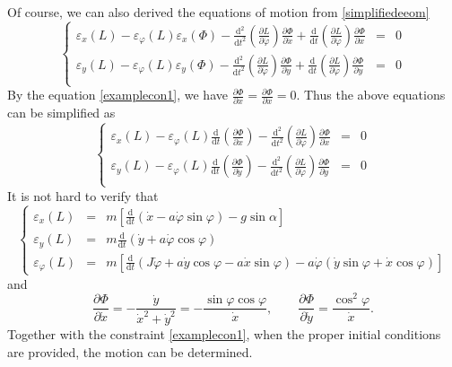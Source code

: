 \documentclass[preprint,11pt]{elsarticle}
\newcommand{\mathd}{\mathrm{d}}
\begin{document}
Of course, we can also derived the equations of motion from \eqref{simplifiedeeom}
\begin{equation}
\left\{\begin{array}{rcl}
    \varepsilon_x (L)-\varepsilon_{\varphi}(L) \varepsilon_{x}(\Phi)-\frac{\mathd^2 }{\mathd t^2}\left(\frac{\partial L}{\partial \dot{\varphi}} \right) \frac{\partial \Phi}{\partial \dot{x}}+\frac{\mathd}{\mathd t}\left( \frac{\partial L}{\partial \dot{\varphi}}\right)\frac{\partial \Phi}{\partial x} & = &0\\[12pt]
      \varepsilon_y (L)-\varepsilon_{\varphi}(L) \varepsilon_{y}(\Phi)-\frac{\mathd^2 }{\mathd t^2}\left(\frac{\partial L}{\partial \dot{\varphi}} \right) \frac{\partial \Phi}{\partial \dot{y}}+\frac{\mathd}{\mathd t}\left( \frac{\partial L}{\partial \dot{\varphi}}\right)\frac{\partial \Phi}{\partial y} & = &0\\
  \end{array}\right.
\end{equation}
By the equation \eqref{examplecon1}, we have $\frac{\partial \Phi}{\partial x}=\frac{\partial \Phi}{\partial x}=0$. Thus the above equations can be simplified as
\begin{equation}\label{simplifiedexampleeuler}
\left\{\begin{array}{rcl}
    \varepsilon_x (L)-\varepsilon_{\varphi}(L) \frac{\mathd}{\mathd t}\left( \frac{\partial \Phi}{\partial \dot{x}}\right) -\frac{\mathd^2 }{\mathd t^2}\left(\frac{\partial L}{\partial \dot{\varphi}} \right) \frac{\partial \Phi}{\partial \dot{x}}& = &0\\[12pt]
    \varepsilon_y (L)-\varepsilon_{\varphi}(L) \frac{\mathd}{\mathd t}\left( \frac{\partial \Phi}{\partial \dot{y}}\right) -\frac{\mathd^2 }{\mathd t^2}\left(\frac{\partial L}{\partial \dot{\varphi}} \right) \frac{\partial \Phi}{\partial \dot{y}}& = &0\\
  \end{array}\right.
\end{equation}
It is not hard to verify that
\begin{equation}
 \left\{\begin{array}{rcl}
 \varepsilon_x (L)&=&m \left[ \frac{\mathd}{\mathd t}\left( \dot{x}-a \dot{\varphi} \sin\varphi\right)- g \sin\alpha\right]\\[6pt]
 \varepsilon_y (L)&=&m  \frac{\mathd}{\mathd t}\left( \dot{y}+a \dot{\varphi} \cos\varphi\right)\\[6pt]
 \varepsilon_\varphi (L)&=&m \left[ \frac{\mathd}{\mathd t}\left( J \dot{\varphi}+a \dot{y}\cos \varphi-a \dot{x} \sin\varphi\right)-a \dot{\varphi}\left(\dot{y} \sin \varphi+\dot{x} \cos \varphi \right)\right]
 \end{array}\right.
\end{equation}
and
\begin{equation}
  \frac{\partial \Phi}{\partial \dot{x}}=- \frac{\dot{y}}{\dot{x}^2+\dot{y}^2}=-\frac{\sin\varphi \cos\varphi}{\dot{x}},\hspace{2em}\frac{\partial \Phi}{\partial \dot{y}}=\frac{\cos^2 \varphi}{\dot{x}}.
\end{equation}
Together with the constraint \eqref{examplecon1}, when the proper initial conditions are provided, the motion can be determined.
\end{document}
